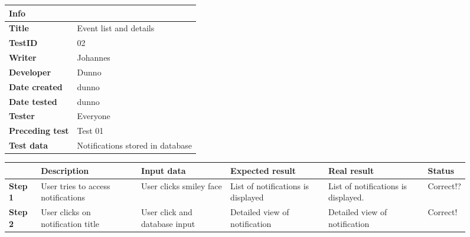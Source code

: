 \begin{figure}
\small

\begin{tabularx}{\textwidth }{|l|X|}
\hline
\cellcolor{blue!25}\textbf{Info} & \cellcolor{blue!25}\\
\hline
\textbf{Title} & Event list and details\\
\hline
\textbf{TestID} & 02\\
\hline
\textbf{Writer}& Johannes\\
\hline
\textbf{Developer}& Dunno\\
\hline
\textbf{Date created}& dunno\\
\hline
\textbf{Date tested}& dunno\\
\hline
\textbf{Tester}& Everyone\\
\hline
\textbf{Preceding test}& Test 01\\
\hline
\textbf{Test data} & Notifications stored in database \\
\hline
\end{tabularx}

\begin{tabularx}{\textwidth}{|X|X|X|X|X|X|}
\hline
\cellcolor{blue!25}&
\cellcolor{blue!25}Description&
\cellcolor{blue!25}Input data&
\cellcolor{blue!25}Expected result&
\cellcolor{blue!25}Real result&
\cellcolor{blue!25}Status\\
\hline
\textbf{Step 1} & User tries to access notifications  & User clicks smiley face & List of notifications is displayed & List of notifications is displayed. & Correct!?\\
\hline
\textbf{Step 2} & User clicks on notification title & User click and database input & Detailed view of notification & Detailed view of notification&Correct!\\
\hline
\end{tabularx}
\label{fig:test02}
\end{figure}